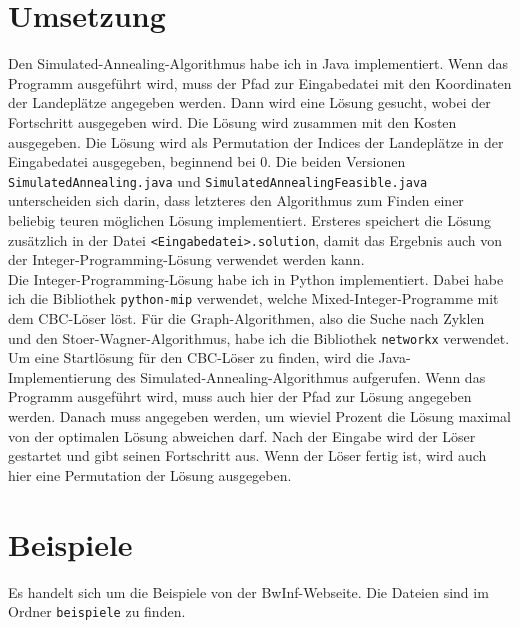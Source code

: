 \documentclass[a4paper,10pt,ngerman]{scrartcl}
\begin{document}
\section{Umsetzung}
Den Simulated-Annealing-Algorithmus habe ich in Java implementiert. Wenn das
Programm ausgeführt wird, muss der Pfad zur Eingabedatei mit den Koordinaten
der Landeplätze angegeben werden. Dann wird eine Lösung gesucht, wobei der
Fortschritt ausgegeben wird. Die Lösung wird zusammen mit den Kosten
ausgegeben. Die Lösung wird als Permutation der Indices der Landeplätze in der
Eingabedatei ausgegeben, beginnend bei 0. Die beiden Versionen
\lstinline|SimulatedAnnealing.java| und
\lstinline|SimulatedAnnealingFeasible.java| unterscheiden sich darin, dass
letzteres den Algorithmus zum Finden einer beliebig teuren möglichen Lösung
implementiert. Ersteres speichert die Lösung zusätzlich in der Datei
\lstinline|<Eingabedatei>.solution|, damit das Ergebnis auch von der
Integer-Programming-Lösung verwendet werden kann. \\ Die
Integer-Programming-Lösung habe ich in Python implementiert. Dabei habe ich die
Bibliothek \lstinline|python-mip| verwendet, welche Mixed-Integer-Programme mit
dem CBC-Löser\cite{john_forrest_2023_7820266} löst. Für die Graph-Algorithmen,
also die Suche nach Zyklen und den Stoer-Wagner-Algorithmus, habe ich die
Bibliothek \lstinline|networkx| verwendet. Um eine Startlösung für den
CBC-Löser zu finden, wird die Java-Implementierung des
Simulated-Annealing-Algorithmus aufgerufen. Wenn das Programm ausgeführt wird,
muss auch hier der Pfad zur Lösung angegeben werden. Danach muss angegeben
werden, um wieviel Prozent die Lösung maximal von der optimalen Lösung
abweichen darf. Nach der Eingabe wird der Löser gestartet und gibt seinen
Fortschritt aus. Wenn der Löser fertig ist, wird auch hier eine Permutation der
Lösung ausgegeben.

\section{Beispiele}
Es handelt sich um die Beispiele von der BwInf-Webseite. Die Dateien sind im
Ordner \lstinline|beispiele| zu finden.
\end{document}
